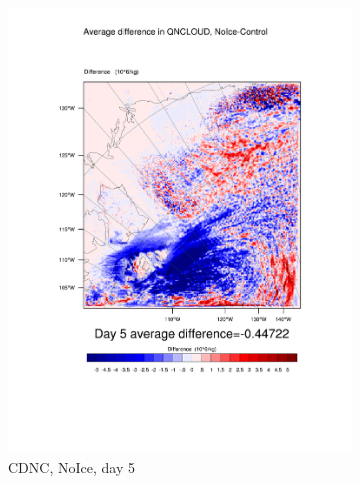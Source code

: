 \begin{figure}
\begin{subfigure}{0.32\textwidth}
		\includegraphics[width=\textwidth]{results/noice/diff_NoIce_QNCLOUD_Day5.pdf}
		\caption{CDNC, NoIce, day 5}
		\label{subfig:CDNCr2Day5}
	\end{subfigure}
	\begin{subfigure}{0.32\textwidth}
		\centering

\end{subfigure}
\end{figure}
